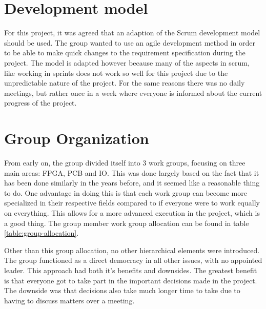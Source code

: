 \section{Development model}
For this project, it was agreed that an adaption of the Scrum development model should be used. The group wanted
to use an agile development method in order to be able to make quick changes to the requirement specification during the project.
The model is adapted however because many of the aspects in scrum, like working in sprints does not work so well for this project due to the unpredictable nature of the project. 
For the same reasons there was no daily meetings, but rather once in a week where everyone is informed about the current progress of the project.
\section{Group Organization}

From early on, the group divided itself into 3 work groups, focusing on three main areas: FPGA, PCB and IO.
This was done largely based on the fact that it has been done similarly in the years before\cn, and it seemed like a reasonable thing to do.
One advantage in doing this is that each work group can become more specialized in their respective fields compared to if everyone were to work equally on everything.
This allows for a more advanced execution in the project, which is a good thing.
The group member work group allocation can be found in table \vref{table:group-allocation}.

Other than this group allocation, no other hierarchical elements were introduced.
The group functioned as a direct democracy in all other issues, with no appointed leader. This approach had both
it's benefits and downsides. The greatest benefit is that everyone got to take part in the important decisions made in the project.
The downside was that decisions also take much longer time to take due to having to discuss matters over a meeting.


